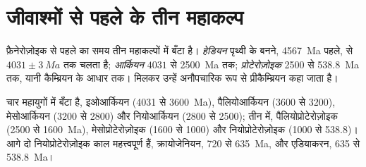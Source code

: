 \section{जीवाश्मों से पहले के तीन महाकल्प}\label{sec:b2:precambrian-earth:eons}

\begin{definition}[हेडियन, आर्कियन, प्रोटेरोज़ोइक]\label{def:b2:precambrian-earth:eons}
फ़ैनेरोज़ोइक से पहले का समय तीन महाकल्पों में बँटा है। \emph{हेडियन}
पृथ्वी के बनने, \qty{4567}{Ma} पहले, से $4031 \pm \qty{3}{Ma}$ तक चलता है;
\emph{आर्कियन} $4031$ से \qty{2500}{Ma} तक;
\emph{प्रोटेरोज़ोइक} 2500 से \qty{538.8}{Ma} तक, यानी कैम्ब्रियन के आधार तक।
मिलकर उन्हें अनौपचारिक रूप से प्रीकैम्ब्रियन कहा जाता है।
\end{definition}

 चार महायुगों में बँटा है, इओआर्कियन (4031 से \qty{3600}{Ma}), पैलियोआर्कियन (3600
से 3200), मेसोआर्कियन (3200 से 2800) और नियोआर्कियन (2800 से 2500);  तीन में,
पैलियोप्रोटेरोज़ोइक (2500 से \qty{1600}{Ma}), मेसोप्रोटेरोज़ोइक (1600 से 1000) और
नियोप्रोटेरोज़ोइक (1000 से 538.8)। आगे दो नियोप्रोटेरोज़ोइक काल महत्त्वपूर्ण हैं, क्रायोजेनियन, 720 से
\qty{635}{Ma}, और एडियाकरन, 635 से \qty{538.8}{Ma}।

